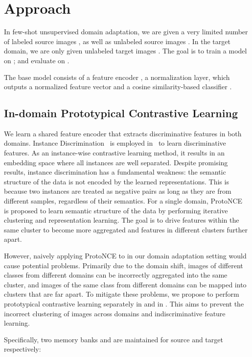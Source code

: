 \documentclass[final]{cvpr}
\begin{document}
\section{Approach}

In few-shot unsupervised domain adaptation, we are given a very limited number of labeled source images , as well as unlabeled source images . In the target domain, we are only given unlabeled target images . The goal is to train a model on ; and evaluate on .

The base model consists of a feature encoder , a  normalization layer, which outputs a normalized feature vector  and a cosine similarity-based classifier . 



\subsection{In-domain Prototypical Contrastive Learning}

We learn a shared feature encoder  that extracts discriminative features in both domains. Instance Discrimination~\cite{wu2018unsupervised} is employed in~\cite{kim2020cross} to learn discriminative features. As an instance-wise contrastive learning method, it results in an embedding space where all instances are well separated. Despite promising results, instance discrimination has a fundamental weakness: the semantic structure of the data is not encoded by the learned representations. This is because two instances are treated as negative pairs as long as they are from different samples, regardless of their semantics. 
For a single domain, ProtoNCE~\cite{li2020prototypical} is proposed to learn semantic structure of the data by performing iterative clustering and representation learning. The goal is to drive features within the same cluster to become more aggregated and features in different clusters further apart. 

However, naively applying ProtoNCE to  in our domain adaptation setting would cause potential problems. Primarily due to the domain shift, images of different classes from different domains can be incorrectly aggregated into the same cluster, and images of the same class from different domains can be mapped into clusters that are far apart. To mitigate these problems, we propose to perform prototypical contrastive learning separately in  and in . This aims to prevent the incorrect clustering of images across domains and indiscriminative feature learning. 

Specifically, two memory banks \bm{} and \bm{} are maintained for source and target respectively:
\end{document}
